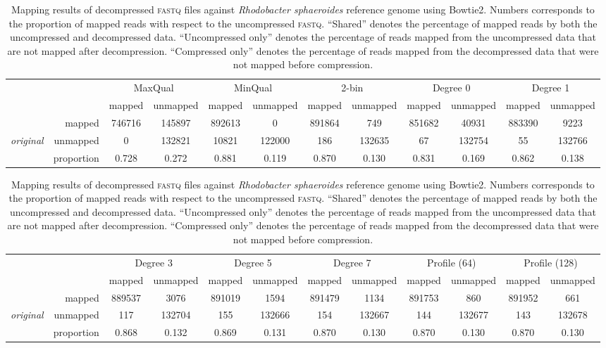 \documentclass{bioinfo}
\begin{document}
\begin{table}[!tbhp]
\centering
\caption[]{Mapping results of decompressed \textsc{fastq} files
  against \textit{Rhodobacter sphaeroides} reference genome using
  Bowtie2. Numbers corresponds to the proportion of mapped reads with
  respect to the uncompressed \textsc{fastq}. ``Shared'' denotes the
  percentage of mapped reads by both the uncompressed and decompressed
  data. ``Uncompressed only'' denotes the percentage of reads mapped
  from the uncompressed data that are not mapped after
  decompression. ``Compressed only'' denotes the percentage of reads
  mapped from the decompressed data that were not mapped before
  compression.}
\begin{tabular}{lr|cc|cc|cc|cc|cc}
 & & \multicolumn{2}{c|}{MaxQual} & \multicolumn{2}{c|}{MinQual} & \multicolumn{2}{c|}{2-bin} & \multicolumn{2}{c|}{Degree 0} & \multicolumn{2}{c}{Degree 1} \\
& & mapped & unmapped & mapped & unmapped & mapped & unmapped & mapped & unmapped & mapped & unmapped \\ 
\cline{2-12}
& mapped & 746716 & 145897 & 892613 &   0 & 891864 & 749 & 851682 & 40931 & 883390 & 9223 \\ 
{\em original} & unmapped &   0 & 132821 & 10821 & 122000 & 186 & 132635 &  67 & 132754 &  55 & 132766 \\ 
\cline{2-12}
& proportion & 0.728 & 0.272 & 0.881 & 0.119 & 0.870 & 0.130 & 0.831 & 0.169 & 0.862 & 0.138 \\ 
\end{tabular}

\bigskip

\begin{tabular}{lr|cc|cc|cc|cc|cc}
 & & \multicolumn{2}{c|}{Degree 3} & \multicolumn{2}{c|}{Degree 5} & \multicolumn{2}{c|}{Degree 7} & \multicolumn{2}{c|}{Profile (64)} & \multicolumn{2}{c}{Profile (128)} \\
& & mapped & unmapped & mapped & unmapped & mapped & unmapped & mapped & unmapped & mapped & unmapped \\ 
\cline{2-12}
& mapped & 889537 & 3076 & 891019 & 1594 & 891479 & 1134 & 891753 & 860 & 891952 & 661 \\ 
{\em original} & unmapped & 117 & 132704 & 155 & 132666 & 154 & 132667 & 144 & 132677 & 143 & 132678 \\ 
\cline{2-12}
& proportion & 0.868 & 0.132 & 0.869 & 0.131 & 0.870 & 0.130 & 0.870 & 0.130 & 0.870 & 0.130 \\ 
\end{tabular}


\end{table}
\end{document}
